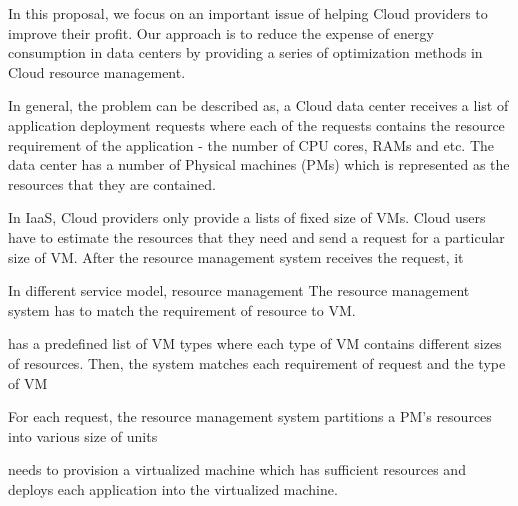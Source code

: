 In this proposal, we focus on an important issue of helping Cloud providers to improve their profit. Our approach is to reduce the expense of energy consumption in data centers by providing a series of optimization methods in Cloud resource management.

In general, the problem can be described as, a Cloud data center receives a list of application deployment requests where each of the requests contains the resource requirement of the application - the number of CPU cores, RAMs and etc. The data center has a number of Physical machines (PMs) which is represented as the resources that they are contained. 

In IaaS, Cloud providers only provide a lists of fixed size of VMs. 
Cloud users have to estimate the resources that they need and send a request for a particular size of VM.
After the resource management system receives the request, it 

In different service model, resource management
The resource management system has to match the requirement of resource to VM.


has a predefined list of VM types where each type of VM contains different sizes of resources. Then, the system matches each requirement of request and the type of VM 


For each request, the resource management system partitions a PM's resources into various size of units



needs to provision a virtualized machine which has sufficient resources and deploys each application into the virtualized machine. 




